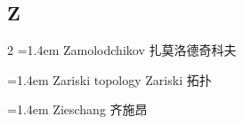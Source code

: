 \subsection*{Z}
\small
\begin{multicols}{2}
\noindent\hangindent=1.4em Zamolodchikov \quad 扎莫洛德奇科夫 \par
\noindent\hangindent=1.4em Zariski topology \quad Zariski 拓扑 \par
\noindent\hangindent=1.4em Zieschang \quad 齐施昂 \par
\end{multicols}


